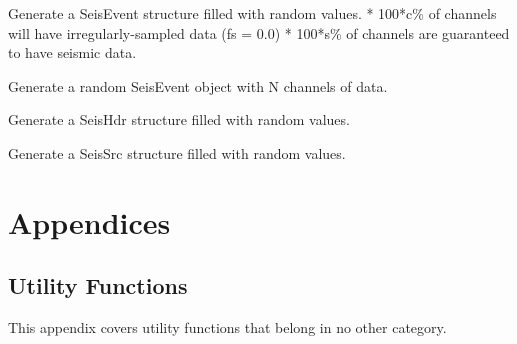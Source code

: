 \documentclass[letterpaper,11pt,english]{sphinxmanual}
\begin{document}
Generate a SeisEvent structure filled with random values.
* 100*c\% of channels  will have irregularly-sampled data (fs = 0.0)
* 100*s\% of channels  are guaranteed to have seismic data.


\begin{fulllineitems}
\end{fulllineitems}


Generate a random SeisEvent object with N channels of data.

\begin{fulllineitems}
\label{\detokenize{src/Submodules/randseis:randSeisHdr}}
\end{fulllineitems}


Generate a SeisHdr structure filled with random values.

\begin{fulllineitems}
\label{\detokenize{src/Submodules/randseis:randSeisSrc}}
\end{fulllineitems}


Generate a SeisSrc structure filled with random values.


\chapter{Appendices}
\label{\detokenize{index:appendices}}

\section{Utility Functions}
\label{\detokenize{src/Appendices/function_list:utility-functions}}\label{\detokenize{src/Appendices/function_list:function-list}}\label{\detokenize{src/Appendices/function_list::doc}}
This appendix covers utility functions that belong in no other category.

\begin{fulllineitems}
\label{\detokenize{src/Appendices/function_list:d2u}}
\end{fulllineitems}
\end{document}
